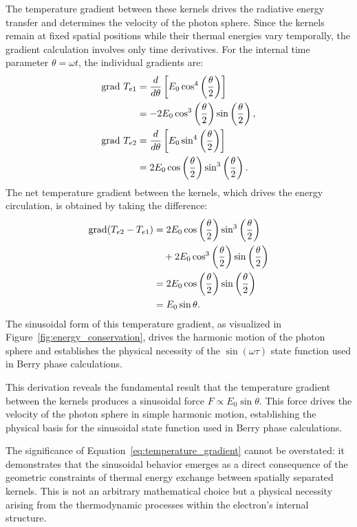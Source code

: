 \documentclass[%
 reprint,
 amsmath,amssymb,
 aps,
]{revtex4-1}
\numberwithin{equation}{section}%
\begin{document}
The temperature gradient between these kernels drives the radiative energy transfer and determines the velocity of the photon sphere. Since the kernels remain at fixed spatial positions while their thermal energies vary temporally, the gradient calculation involves only time derivatives. For the internal time parameter $\theta = \omega t$, the individual gradients are:
\begin{align}
\mathrm{grad} \ T_{e1} &= \frac{d}{d\theta}\left[E_0 \cos^4\left(\frac{\theta}{2}\right)\right] \notag \\
&= -2E_0 \cos^3\left(\frac{\theta}{2}\right) \sin\left(\frac{\theta}{2}\right), \label{eq:grad_Te1}\\
\mathrm{grad} \ T_{e2} &= \frac{d}{d\theta}\left[E_0 \sin^4\left(\frac{\theta}{2}\right)\right] \notag \\
&= 2E_0 \cos\left(\frac{\theta}{2}\right) \sin^3\left(\frac{\theta}{2}\right). \label{eq:grad_Te2}
\end{align}
The net temperature gradient between the kernels, which drives the energy circulation, is obtained by taking the difference:
\begin{align}
\mathrm{grad}(T_{e2} - T_{e1}) &= 2E_0 \cos\left(\frac{\theta}{2}\right) \sin^3\left(\frac{\theta}{2}\right) \notag \\
& \quad + 2E_0 \cos^3\left(\frac{\theta}{2}\right) \sin\left(\frac{\theta}{2}\right) \notag \\
&= 2E_0 \cos\left(\frac{\theta}{2}\right) \sin\left(\frac{\theta}{2}\right) \notag \\
&= E_0 \sin\theta. \label{eq:temperature_gradient}
\end{align}
The sinusoidal form of this temperature gradient, as visualized in Figure~\ref{fig:energy_conservation}, drives the harmonic motion of the photon sphere and establishes the physical necessity of the $\sin(\omega\tau)$ state function used in Berry phase calculations.

This derivation reveals the fundamental result that the temperature gradient between the kernels produces a sinusoidal force $F \propto E_0 \sin\theta$. This force drives the velocity of the photon sphere in simple harmonic motion, establishing the physical basis for the sinusoidal state function used in Berry phase calculations.

The significance of Equation~\eqref{eq:temperature_gradient} cannot be overstated: it demonstrates that the sinusoidal behavior emerges as a direct consequence of the geometric constraints of thermal energy exchange between spatially separated kernels. This is not an arbitrary mathematical choice but a physical necessity arising from the thermodynamic processes within the electron's internal structure.
\end{document}
